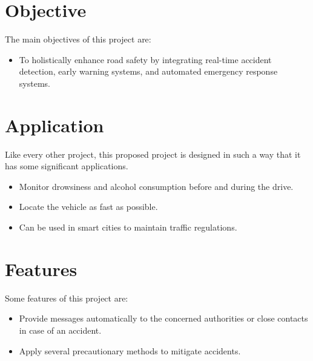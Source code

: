 \documentclass[12pt,a4paper]{report}
\begin{document}
	\section{Objective}
	
	\raggedright
	{ The main objectives of this project are: \\
		\begin{itemize}
			\item To holistically enhance road safety by integrating real-time accident detection, early warning systems, and automated emergency response systems.
		\end{itemize}
	}
	\section{Application}
 \raggedright
 {
 Like every other project, this proposed project is designed in such a way that it has some significant applications.
\begin{itemize}
    \item 	Monitor drowsiness and alcohol consumption before and during the drive.
    \item Locate the vehicle as fast as possible.
    \item Can be used in smart cities to maintain traffic regulations. 
\end{itemize}
 }

	\section{Features}
	
	\raggedright
	{ Some features of this project are: \\
		\begin{itemize}
			\item Provide messages automatically to the concerned authorities or close contacts in case of an accident.
    \item 	Apply several precautionary methods to mitigate accidents.	
			
		\end{itemize}
	}
	
\end{document}
